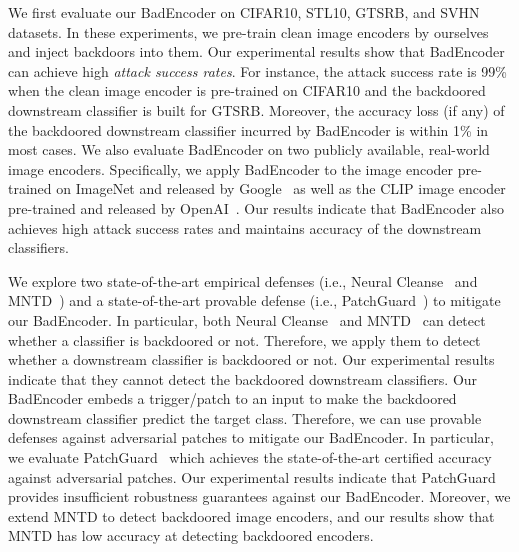 We first evaluate our BadEncoder on CIFAR10, STL10, GTSRB, and SVHN datasets. In these experiments, we pre-train clean image encoders by ourselves and inject backdoors into them.  
Our experimental results show that BadEncoder can achieve high \emph{attack success rates}. %
For instance, the attack success rate is 99\% when the clean image encoder is pre-trained on CIFAR10 and the backdoored downstream classifier is built for GTSRB. Moreover,  
the accuracy loss (if any) of the backdoored downstream classifier incurred by BadEncoder is within 1\% in most cases. We also evaluate  BadEncoder on two publicly available, real-world image encoders. Specifically, we apply  BadEncoder to the image  encoder  pre-trained  on  ImageNet  and  released  by  Google~\cite{chen2020simple}  as  well  as  the   CLIP image  encoder pre-trained and released by OpenAI~\cite{radford2021learning}.  Our results indicate that  BadEncoder also achieves high attack success rates and maintains  accuracy of the downstream classifiers. 

We explore two state-of-the-art empirical defenses (i.e., Neural Cleanse~\cite{wang2019neural} and MNTD~\cite{xu2019detecting}) and a state-of-the-art provable defense (i.e., PatchGuard~\cite{xiang2020patchguard}) to mitigate our BadEncoder. In particular, both Neural Cleanse~\cite{wang2019neural} and MNTD~\cite{xu2019detecting} can detect whether a classifier is backdoored or not. Therefore, we apply them to detect  whether a downstream classifier is backdoored or not. Our experimental results indicate that they cannot detect the backdoored downstream classifiers. Our BadEncoder embeds a trigger/patch to an input to make the backdoored downstream classifier predict the target class. Therefore, we can use provable defenses against adversarial patches to mitigate our BadEncoder. In particular, we evaluate PatchGuard~\cite{xiang2020patchguard} which achieves the state-of-the-art certified accuracy against adversarial patches. Our experimental results indicate that PatchGuard provides insufficient robustness guarantees against our BadEncoder. Moreover, we extend MNTD to detect backdoored image encoders, and our results show that MNTD has low accuracy at detecting backdoored encoders. %

